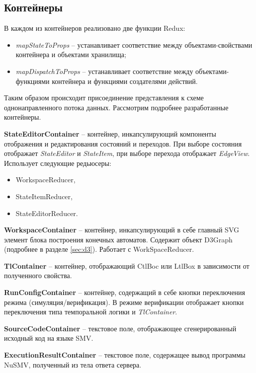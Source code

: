 \subsection{Контейнеры}

В каждом из контейнеров реализовано две функции Redux: 

\begin{itemize}
	\item \textit{mapStateToProps} -- устанавливает соответствие между объектами-свойствами контейнера и объектами хранилища;
	\item \textit{mapDispatchToProps} -- устанавливает соответствие между объектами-функциями контейнера и функциями создателями действий.
\end{itemize}

Таким образом происходит присоединение представления к схеме однонаправленного потока данных. Рассмотрим подробнее разработанные контейнеры.

\textbf{StateEditorContainer} -- контейнер, инкапсулирующий компоненты отображения и редактирования состояний и переходов. При выборе состояния отображает \textit{StateEditor} и \textit{StateItem}, при выборе перехода отображает \textit{EdgeView}. Использует следующие редьюсеры:

\begin{itemize}
	\item WorkspaceReducer,
	\item StateItemReducer,
	\item StateEditorReducer.
\end{itemize}

\textbf{WorkspaceContainer} -- контейнер, инкапсулирующий в себе главный SVG элемент блока построения конечных автоматов. Содержит объект D3Graph (подробнее в разделе \ref{sec:d3}). Работает с WorkSpaceReducer.

\textbf{TlContainer} -- контейнер, отображающий CtlBoc или LtlBox в зависимости от полученного свойства.

\textbf{RunConfigContainer} -- контейнер, содержащий в себе кнопки переключения режима (симуляция/верификация). В режиме верификации отображает кнопки переключения типа темпоральной логики и \textit{TlContainer}.

\textbf{SourceCodeContainer} -- текстовое поле, отображающее сгенерированный исходный код на языке SMV.

\textbf{ExecutionResultContainer} -- текстовое поле, содержащее вывод программы NuSMV, полученный из тела ответа сервера.

